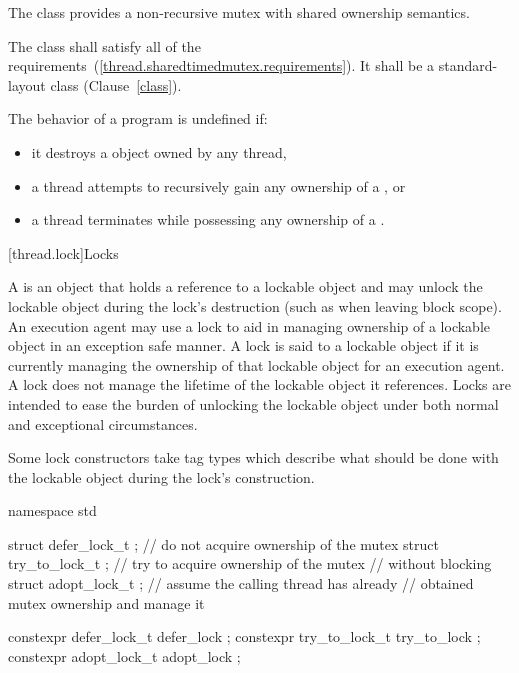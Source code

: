 \pnum
The class  provides a non-recursive mutex with shared
ownership semantics.

\pnum
The class  shall satisfy all of the 
requirements~(\ref{thread.sharedtimedmutex.requirements}). It shall be a
standard-layout class (Clause~\ref{class}).

\pnum
The behavior of a program is undefined if:
\begin{itemize}
\item it destroys a  object owned by any thread,
\item a thread attempts to recursively gain any ownership of a , or
\item a thread terminates while possessing any ownership of a .
\end{itemize}

[thread.lock]{Locks}

\pnum
A  is an object that holds a reference to a lockable object and may unlock the
lockable object during the lock's destruction (such as when leaving block scope). An execution
agent may use a lock to aid in managing ownership of a lockable object in an exception safe
manner. A lock is said to  a lockable object if it is currently managing the
ownership of that lockable object for an execution agent. A lock does not manage the lifetime
of the lockable object it references. \enternote Locks are intended to ease the burden of
unlocking the lockable object under both normal and exceptional circumstances. \exitnote

\pnum
Some lock constructors take tag types which describe what should be done with the lockable
object during the lock's construction.

%
%
%
%
%
%
\begin{codeblock}
namespace std {
  struct defer_lock_t  { };     // do not acquire ownership of the mutex
  struct try_to_lock_t { };     // try to acquire ownership of the mutex
                                // without blocking
  struct adopt_lock_t  { };     // assume the calling thread has already
                                // obtained mutex ownership and manage it

  constexpr defer_lock_t   defer_lock { };
  constexpr try_to_lock_t  try_to_lock { };
  constexpr adopt_lock_t   adopt_lock { };
}
\end{codeblock}


